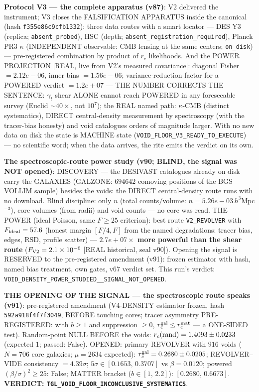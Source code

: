 \documentclass[11pt]{article}
\theoremstyle{definition}\newtheorem{deriv}{Derivation}
\begin{document}
\textbf{Protocol V3 --- the complete apparatus (v87)}: V2 delivered the instrument; V3 closes the FALSIFICATION APPARATUS inside the canonical (hash \texttt{f355e86c9cfb1332}): three data routes with a smart locator --- DES Y3 (replica; \texttt{absent\_probed}), HSC (depth; \texttt{absent\_registration\_required}), Planck PR3 $\kappa$ (INDEPENDENT observable: CMB lensing at the same centers; \texttt{on\_disk}) --- pre-registered combination by product of $r_c$ likelihoods. And the POWER PROJECTION [REAL, live from V2's measured covariance]: diagonal Fisher $=2.12e-06$, inner bins $=1.56e-06$; variance-reduction factor for a POWERED verdict $=1.2e+07$ --- THE NUMBER CORRECTS THE SENTENCE: $\gamma_t$ shear ALONE cannot reach POWERED in any foreseeable survey (Euclid $\sim40\times$, not $10^7$); the REAL named path: $\kappa$-CMB (distinct systematics), DIRECT central-density measurement by spectroscopy (with the tracer-bias honesty) and void catalogues orders of magnitude larger. With no new data on disk the state is MACHINE state (\texttt{VOID\_FLOOR\_V3\_READY\_TO\_EXECUTE}) --- no scientific word; when the data arrives, the rite emits the verdict on its own.

\textbf{The spectroscopic-route power study (v90; BLIND, the signal was NOT opened)}: DISCOVERY --- the DESIVAST catalogues already on disk carry the GALAXIES (GALZONE: $694642$ comoving positions of the BGS VOLLIM sample) besides the voids: the DIRECT central-density route runs with no download. Blind discipline: only $\bar n$ (total counts$/$volume: $\bar n=5.26e-03\,h^3$Mpc$^{-3}$), core volumes (from radii) and void counts --- no core was read. THE POWER (ideal Poisson, same $F\ge25$ criterion): best route \texttt{V2\_REVOLVER} with $F_{\rm ideal}=57.6$ (honest margin $[F/4,F]$ from the named degradations: tracer bias, edges, RSD, profile scatter) --- \textbf{$2.7e+07\times$ more powerful than the shear route} ($F_{\rm V2}=2.1\times10^{-6}$ [REAL historical, seal v90]). Opening the signal is RESERVED to the pre-registered amendment (v91): frozen estimator with hash, named bias treatment, own gates, v67 verdict set. This run's verdict: \texttt{VOID\_DENSITY\_POWER\_STUDIED\_\_SIGNAL\_NOT\_OPENED}.

\textbf{THE OPENING OF THE SIGNAL --- the spectroscopic route speaks (v91)}: pre-registered amendment (V4-DENSITY estimator frozen, hash \texttt{592a918f4f7f3049}, BEFORE touching cores; tracer asymmetry PRE-REGISTERED: with $b\ge1$ and suppression $\ge0$, $r_c^{\rm gal}\le r_c^{\rm mat}$ --- a ONE-SIDED test). Random-point NULL BEFORE the voids: $r_c({\rm rand})=1.4093\pm0.0233$ (expected $1$; passed: False). OPENED: primary REVOLVER with $916$ voids ($N=706$ core galaxies; $\mu=2634$ expected): $r_c^{\rm gal}=0.2680\pm0.0205$; REVOLVER--VIDE consistency $=4.39\sigma$; $5\sigma\in[0.1653,\,0.3707]$ vs $\beta=0.0120$; powered $(\beta/\sigma)^2\ge25$: False; MATTER bracket ($b\in[1,\,2.2]$): $[0.2680,\,0.6673]$. \textbf{VERDICT: \texttt{TGL\_VOID\_FLOOR\_INCONCLUSIVE\_SYSTEMATICS}}.
\end{document}
